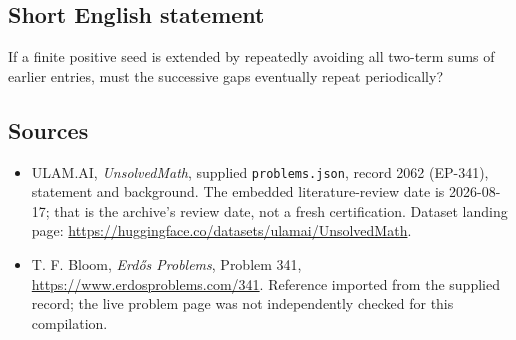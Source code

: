 \documentclass[11pt,a4paper]{article}
\begin{document}
\subsection{Short English statement}

If a finite positive seed is extended by repeatedly avoiding all two-term sums of earlier entries, must the successive gaps eventually repeat periodically?

\subsection{Sources}

{\small

\begin{itemize}

\item[\hypertarget{source:2062:1}{S1}] ULAM.AI, \emph{UnsolvedMath}, supplied \texttt{problems.json}, record 2062 (EP-341), statement and background. The embedded literature-review date is 2026-08-17; that is the archive’s review date, not a fresh certification. Dataset landing page: \url{https://huggingface.co/datasets/ulamai/UnsolvedMath}.

\item[\hypertarget{source:2062:2}{S2}] T. F. Bloom, \emph{Erdős Problems}, Problem 341, \url{https://www.erdosproblems.com/341}. Reference imported from the supplied record; the live problem page was not independently checked for this compilation.

\end{itemize}

}

\label{end:2062}
\end{document}
